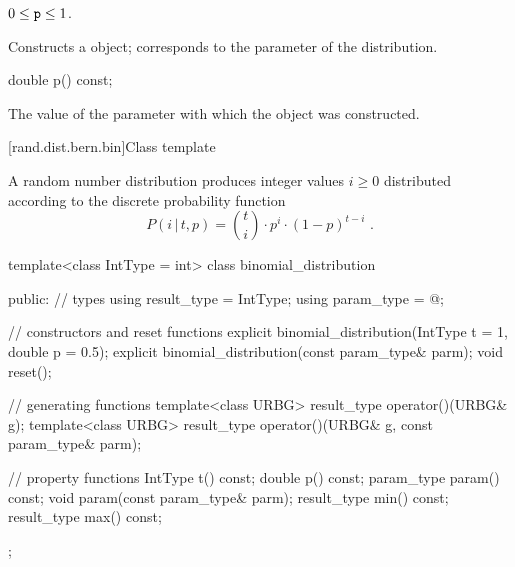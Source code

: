 \begin{itemdescr}
\pnum\requires
 $0 \leq \texttt{p} \leq 1$.

\pnum\effects Constructs a  object;
 corresponds to the parameter of the distribution.
\end{itemdescr}

%
\begin{itemdecl}
double p() const;
\end{itemdecl}

\begin{itemdescr}
\pnum\returns The value of the  parameter
 with which the object was constructed.
\end{itemdescr}


[rand.dist.bern.bin]{Class template }%
%
%

\pnum
A  random number distribution
produces integer values $i \geq 0$
distributed according to
the discrete probability function%
%
%
\[ P(i\,|\,t,p) = \binom{t}{i} \cdot p^i \cdot (1-p)^{t-i} \text{ .} \]

%
\begin{codeblock}
template<class IntType = int>
  class binomial_distribution {
  public:
    // types
    using result_type = IntType;
    using param_type  = @\unspec@;

    // constructors and reset functions
    explicit binomial_distribution(IntType t = 1, double p = 0.5);
    explicit binomial_distribution(const param_type& parm);
    void reset();

    // generating functions
    template<class URBG>
      result_type operator()(URBG& g);
    template<class URBG>
      result_type operator()(URBG& g, const param_type& parm);

    // property functions
    IntType t() const;
    double p() const;
    param_type param() const;
    void param(const param_type& parm);
    result_type min() const;
    result_type max() const;
  };
\end{codeblock}


